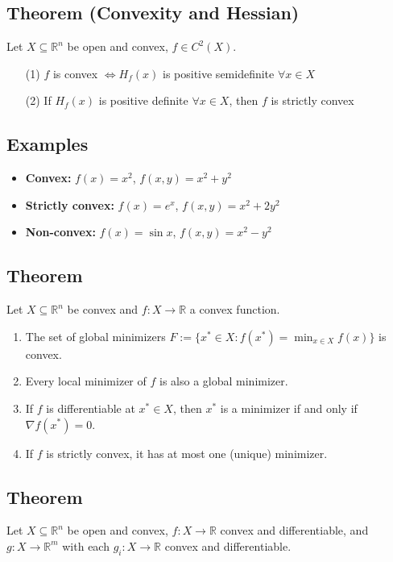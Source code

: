 \documentclass{article}
\begin{document}
\subsection*{Theorem (Convexity and Hessian)}
Let $X \subseteq \mathbb{R}^n$ be open and convex, $f \in C^2(X)$.
\begin{itemize}
    \item[(1)] $f$ is convex $\Leftrightarrow H_f(x)$ is positive semidefinite $\forall x \in X$
    \item[(2)] If $H_f(x)$ is positive definite $\forall x \in X$, then $f$ is strictly convex
\end{itemize}

\subsection*{Examples}
\begin{itemize}
    \item \textbf{Convex:} $f(x) = x^2$, $f(x,y) = x^2 + y^2$
    \item \textbf{Strictly convex:} $f(x) = e^x$, $f(x,y) = x^2 + 2y^2$
    \item \textbf{Non-convex:} $f(x) = \sin x$, $f(x,y) = x^2 - y^2$
\end{itemize}

\subsection{Theorem} Let $X \subseteq \mathbb{R}^n$
be convex and $f:X \to \mathbb{R}$ a convex function.

\begin{enumerate}[label=(\arabic*)] \item The set of global minimizers $F := \{
x^* \in X : f(x^*) = \min_{x \in X} f(x) \}$ is convex. \item Every local
minimizer of $f$ is also a global minimizer. \item If $f$ is differentiable at
$x^* \in X$, then $x^*$ is a minimizer if and only if $\nabla f(x^*) = 0$. \item
If $f$ is strictly convex, it has at most one (unique) minimizer.
\end{enumerate}

\subsection{Theorem} Let $X \subseteq \mathbb{R}^n$ be
open and convex, $f:X \to \mathbb{R}$ convex and differentiable, and $g:X \to
\mathbb{R}^m$ with each $g_i:X \to \mathbb{R}$ convex and differentiable.
\end{document}
